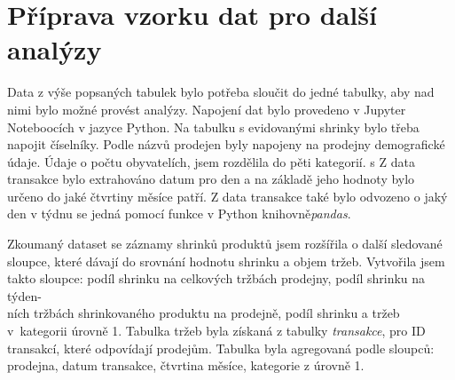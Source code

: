 \section{Příprava vzorku dat pro další analýzy}
\label{sec:priprava}
Data z výše popsaných tabulek bylo potřeba sloučit do jedné tabulky, aby nad nimi bylo možné provést analýzy. Napojení dat bylo provedeno v Jupyter Noteboocích v jazyce Python. Na tabulku s evidovanými shrinky bylo třeba napojit číselníky. Podle názvů prodejen byly napojeny na prodejny demografické údaje. Údaje o počtu obyvatelích, jsem rozdělila do pěti kategorií. s Z data transakce bylo extrahováno datum pro den a na základě jeho hodnoty bylo určeno do jaké čtvrtiny měsíce patří. Z data transakce také bylo odvozeno o jaký den v týdnu se jedná pomocí funkce v Python knihovně\emph{pandas}.

Zkoumaný dataset se záznamy shrinků produktů jsem rozšířila o další sledované sloupce, které dávají do srovnání hodnotu shrinku a objem tržeb. Vytvořila jsem takto sloupce: podíl shrinku na celkových tržbách prodejny, podíl shrinku na týden-\\ních tržbách shrinkovaného produktu na prodejně, podíl shrinku a tržeb v~kategorii úrovně 1. Tabulka tržeb byla získaná z tabulky \emph{transakce}, pro ID transakcí, které odpovídají prodejům. Tabulka byla agregovaná podle sloupců: prodejna, datum transakce, čtvrtina měsíce, kategorie z úrovně 1.




